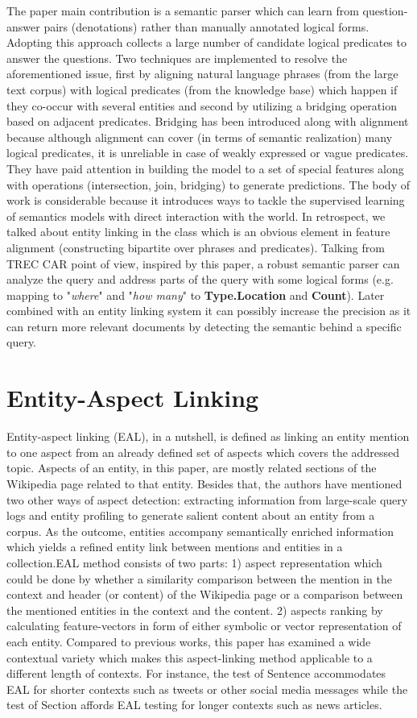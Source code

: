 \documentclass[letterpaper,12pt]{article}
\begin{document}
The paper main contribution is a semantic parser which can learn from question-answer pairs (denotations) rather than manually annotated logical forms. Adopting this approach collects a large number of candidate logical predicates to answer the questions. Two techniques are implemented to resolve the aforementioned issue, first by aligning natural language phrases (from the large text corpus) with logical predicates (from the knowledge base) which happen if they co-occur with several entities and second by utilizing a bridging operation based on adjacent predicates. Bridging has been introduced along with alignment because although alignment can cover (in terms of semantic realization) many logical predicates, it is unreliable in case of weakly expressed or vague predicates. They have paid attention in building the model to a set of special features along with operations (intersection, join, bridging) to generate predictions. The body of work is considerable because it introduces ways to tackle the supervised learning of semantics models with direct interaction with the world. In retrospect, we talked about entity linking in the class which is an obvious element in feature alignment (constructing bipartite over phrases and predicates). Talking from TREC CAR point of view, inspired by this paper, a robust semantic parser can analyze the query and address parts of the query with some logical forms (e.g. mapping to "\textit{where}" and "\textit{how many}" to \textbf{Type.Location} and \textbf{Count}). Later combined with an entity linking system it can possibly increase the precision as it can return more relevant documents by detecting the semantic behind a specific query.

\section{Entity-Aspect Linking}
Entity-aspect linking (EAL), in a nutshell, is defined as linking an entity mention to one aspect from an already defined set of aspects which covers the addressed topic. Aspects of an entity, in this paper, are mostly related sections of the Wikipedia page related to that entity. Besides that, the authors have mentioned two other ways of aspect detection: extracting information from large-scale query logs and entity profiling to generate salient content about an entity from a corpus. As the outcome, entities accompany semantically enriched information which yields a refined entity link between mentions and entities in a collection.EAL method consists of two parts: 1) aspect representation which could be done by whether a similarity comparison between the mention in the context and header (or content) of the Wikipedia page or a comparison between the mentioned entities in the context and the content. 2) aspects ranking by calculating feature-vectors in form of either symbolic or vector representation of each entity. Compared to previous works, this paper has examined a wide contextual variety which makes this aspect-linking method applicable to a different length of contexts. For instance, the test of Sentence accommodates EAL for shorter contexts such as tweets or other social media messages while the test of Section affords EAL testing for longer contexts such as news articles.
\end{document}
